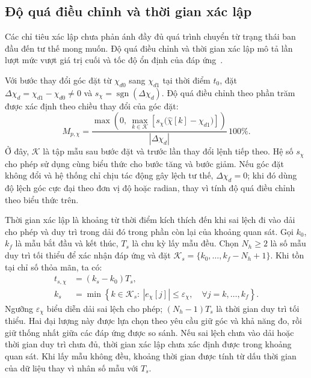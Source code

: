 \subsection{Độ quá điều chỉnh và thời gian xác lập}

Các chỉ tiêu xác lập chưa phản ánh đầy đủ quá trình chuyển từ trạng thái ban đầu đến tư thế mong muốn. Độ quá điều chỉnh và thời gian xác lập mô tả lần lượt mức vượt giá trị cuối và tốc độ ổn định của đáp ứng~\cite{astrom2021feedback}.

Với bước thay đổi góc đặt từ $\chi_{d0}$ sang $\chi_{d1}$ tại thời điểm $t_0$, đặt $\Delta\chi_d=\chi_{d1}-\chi_{d0}\ne0$ và $s_\chi=\operatorname{sgn}(\Delta\chi_d)$. Độ quá điều chỉnh theo phần trăm được xác định theo chiều thay đổi của góc đặt:
\begin{equation}
	M_{p,\chi}=\frac{\max\!\left(0,\ \max_{k\in\mathcal K}
		\left[s_\chi\bigl(\hat\chi[k]-\chi_{d1}\bigr)\right]\right)}
	{|\Delta\chi_d|}\,100\%.
	\label{eq:background-overshoot}
\end{equation}
Ở đây, $\mathcal K$ là tập mẫu sau bước đặt và trước lần thay đổi lệnh tiếp theo. Hệ số $s_\chi$ cho phép sử dụng cùng biểu thức cho bước tăng và bước giảm. Nếu góc đặt không đổi và hệ thống chỉ chịu tác động gây lệch tư thế, $\Delta\chi_d=0$; khi đó dùng độ lệch góc cực đại theo đơn vị độ hoặc radian, thay vì tính độ quá điều chỉnh theo biểu thức trên.

Thời gian xác lập là khoảng từ thời điểm kích thích đến khi sai lệch đi vào dải cho phép và duy trì trong dải đó trong phần còn lại của khoảng quan sát. Gọi $k_0$, $k_f$ là mẫu bắt đầu và kết thúc, $T_s$ là chu kỳ lấy mẫu đều. Chọn $N_h\geq2$ là số mẫu duy trì tối thiểu để xác nhận đáp ứng và đặt $\mathcal K_s=\{k_0,\ldots,k_f-N_h+1\}$. Khi tồn tại chỉ số thỏa mãn, ta có:
\begin{equation}
	\begin{aligned}
		t_{s,\chi} & =(k_s-k_0)T_s,                 \\
		k_s        & =\min\left\{k\in\mathcal K_s:\
		|e_\chi[j]|\leq\varepsilon_\chi,
		\quad \forall j=k,\ldots,k_f\right\}.
	\end{aligned}
	\label{eq:background-settling-time}
\end{equation}
Ngưỡng $\varepsilon_\chi$ biểu diễn dải sai lệch cho phép; $(N_h-1)T_s$ là thời gian duy trì tối thiểu. Hai đại lượng này được lựa chọn theo yêu cầu giữ góc và khả năng đo, rồi giữ thống nhất giữa các đáp ứng được so sánh. Nếu sai lệch chưa vào dải hoặc thời gian duy trì chưa đủ, thời gian xác lập chưa xác định được trong khoảng quan sát. Khi lấy mẫu không đều, khoảng thời gian được tính từ dấu thời gian của dữ liệu thay vì nhân số mẫu với $T_s$.

